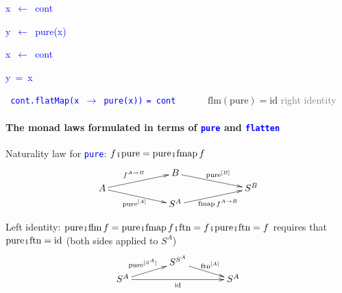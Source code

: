 \texttt{\textcolor{blue}{\footnotesize{}}}%
\begin{minipage}[c][1\totalheight][t]{0.49\columnwidth}%
\begin{lyxcode}
\textcolor{blue}{\footnotesize{}x~$\leftarrow$~cont}{\footnotesize\par}

\textcolor{blue}{\footnotesize{}y~$\leftarrow$~pure(x)}{\footnotesize\par}
\end{lyxcode}
%
\end{minipage}\texttt{\textcolor{blue}{\footnotesize{}\hfill{}}}%
\begin{minipage}[c][1\totalheight][t]{0.49\columnwidth}%
\begin{lyxcode}
\textcolor{blue}{\footnotesize{}x~$\leftarrow$~cont}{\footnotesize\par}

\textcolor{blue}{\footnotesize{}y~=~x}{\footnotesize\par}
\end{lyxcode}
%
\end{minipage}\texttt{\textcolor{blue}{\footnotesize{}\hfill{}\medskip{}
cont.flatMap(x $\rightarrow$ pure(x))}} \texttt{\textcolor{blue}{\footnotesize{}=
cont}} $\quad\quad\quad\text{flm}\left(\text{pure}\right)=\text{id}$
\textcolor{gray}{\textendash{} right identity}


\paragraph{The monad laws formulated in terms of \texttt{\textcolor{blue}{\footnotesize{}pure}}
and \texttt{\textcolor{blue}{\footnotesize{}flatten}} }

Naturality law for \texttt{\textcolor{blue}{\footnotesize{}pure}}:
$f\bef\text{pure}=\text{pure}\bef\text{fmap}\,f$
\[
\xymatrix{\xyScaleY{0.2pc}\xyScaleX{5pc} & B\ar[rd]\sp(0.5){\ \text{pure}^{\left[B\right]}}\\
A\ar[ru]\sp(0.5){f^{A\rightarrow B}\ }\ar[rd]\sb(0.5){\text{pure}^{[A]}\,} &  & S^{B}\\
 & S^{A}\ar[ru]\sb(0.5){\text{fmap}\,f^{A\rightarrow B}}
}
\]

Left identity: $\text{pure}\bef\text{flm}\,f=\text{pure}\bef\text{fmap}\,f\bef\text{ftn}=f\bef\text{pure}\bef\text{ftn}=f$
requires that $\text{pure}\bef\text{ftn}=\text{id}$ (both sides applied
to $S^{A}$)
\[
\xymatrix{\xyScaleY{0.2pc}\xyScaleX{3pc} & S^{S^{A}}\ar[rd]\sp(0.5){\ \text{ftn}^{[A]}\ }\\
S^{A}\ar[ru]\sp(0.5){\text{pure}^{[S^{A}]}\ }\ar[rr]\sb(0.5){\text{id}} &  & S^{A}
}
\]

